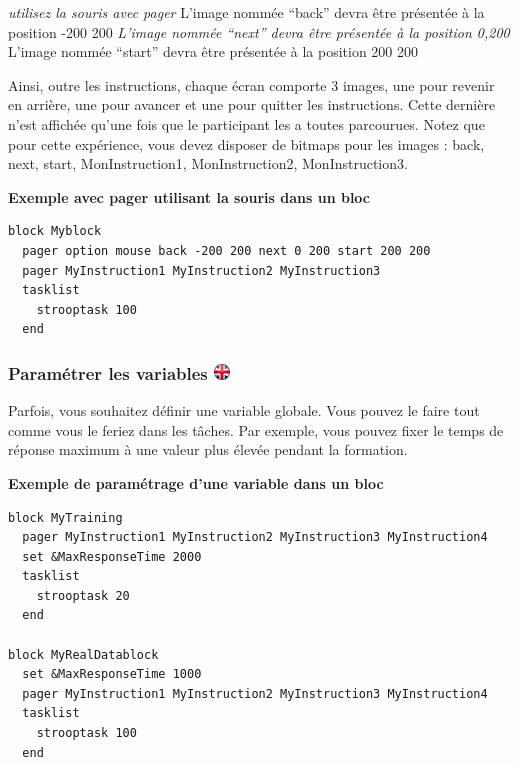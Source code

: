 \documentclass[
]{book}
\begin{document}
\emph{utilisez la souris avec pager }L'image nommée ``back'' devra être
présentée à la position -200 200 \emph{L'image nommée ``next'' devra
être présentée à la position 0,200 }L'image nommée ``start'' devra être
présentée à la position 200 200

Ainsi, outre les instructions, chaque écran comporte 3 images, une pour
revenir en arrière, une pour avancer et une pour quitter les
instructions. Cette dernière n'est affichée qu'une fois que le
participant les a toutes parcourues. Notez que pour cette expérience,
vous devez disposer de bitmaps pour les images : back, next, start,
MonInstruction1, MonInstruction2, MonInstruction3.

\textbf{Exemple avec pager utilisant la souris dans un bloc}

\begin{verbatim}
block Myblock
  pager option mouse back -200 200 next 0 200 start 200 200
  pager MyInstruction1 MyInstruction2 MyInstruction3
  tasklist
    strooptask 100
  end
\end{verbatim}

\hypertarget{paramuxe9trer-les-variables}{%
\subsubsection[Paramétrer les variables ]{\texorpdfstring{Paramétrer les
variables
\href{https://www.psytoolkit.org/doc3.2.0/syntax.html\#block-set}{\protect\includegraphics{img/ukflag.png}}}{Paramétrer les variables }}\label{paramuxe9trer-les-variables}}

Parfois, vous souhaitez définir une variable globale. Vous pouvez le
faire tout comme vous le feriez dans les tâches. Par exemple, vous
pouvez fixer le temps de réponse maximum à une valeur plus élevée
pendant la formation.

\textbf{Exemple de paramétrage d'une variable dans un bloc}

\begin{verbatim}
block MyTraining
  pager MyInstruction1 MyInstruction2 MyInstruction3 MyInstruction4
  set &MaxResponseTime 2000
  tasklist
    strooptask 20
  end

block MyRealDatablock
  set &MaxResponseTime 1000
  pager MyInstruction1 MyInstruction2 MyInstruction3 MyInstruction4
  tasklist
    strooptask 100
  end
\end{verbatim}
\end{document}
